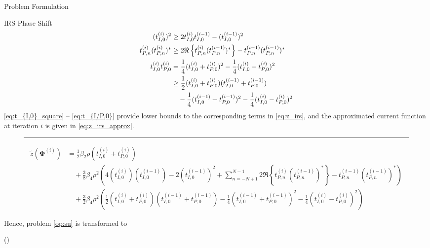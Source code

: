\documentclass{IEEEtran}
\begin{document}
\begin{section}{Problem Formulation}
\begin{subsection}{IRS Phase Shift}
\begin{align}
			(t_{I,0}^{(i)})^2
			& \ge 2 t_{I,0}^{(i)}t_{I,0}^{(i-1)} - (t_{I,0}^{(i-1)})^2\label{eq:t_{I,0}_square}\\
			t_{P,n}^{(i)} (t_{P,n}^{(i)})^*
			& \ge 2 \Re\left\{t_{P,n}^{(i)} (t_{P,n}^{(i-1)})^*\right\} - t_{P,n}^{(i-1)} (t_{P,n}^{(i-1)})^*\\
			t_{I,0}^{(i)} t_{P,0}^{(i)}
			& = \frac{1}{4}(t_{I,0}^{(i)} + t_{P,0}^{(i)})^2 - \frac{1}{4}(t_{I,0}^{(i)} - t_{P,0}^{(i)})^2\nonumber\\
			& \ge \frac{1}{2}(t_{I,0}^{(i)} + t_{P,0}^{(i)})(t_{I,0}^{(i-1)} + t_{P,0}^{(i-1)})\nonumber\\
			& \quad - \frac{1}{4}(t_{I,0}^{(i-1)} + t_{P,0}^{(i-1)})^2 - \frac{1}{4}(t_{I,0}^{(i)} - t_{P,0}^{(i)})^2\label{eq:t_{I/P,0}}
		\end{align}
		\ref{eq:t_{I,0}_square} -- \ref{eq:t_{I/P,0}} provide lower bounds to the corresponding terms in \ref{eq:z_irs}, and the approximated current function at iteration $i$ is given in \ref{eq:z_irs_approx}.
		\begin{figure}[b]
			\hrule
			\begin{equation}\label{eq:z_irs_approx}
				\begin{split}
					\tilde{z}(\boldsymbol{\Phi}^{(i)})
					& = \frac{1}{2}{\beta_2}{\rho}(t_{I,0}^{(i)}+t_{P,0}^{(i)})\\
					& \quad + \frac{3}{8}{\beta_4}{\rho^2} \left(4 (t_{I,0}^{(i)})(t_{I,0}^{(i-1)}) - 2 (t_{I,0}^{(i-1)})^2 + \sum_{n=-N+1}^{N-1}{2 \Re\left\{t_{P,n}^{(i)} (t_{P,n}^{(i-1)})^*\right\} - t_{P,n}^{(i-1)} (t_{P,n}^{(i-1)})^*}\right)\\
					& \quad + \frac{3}{2}{\beta_4}{\rho^2} \left(\frac{1}{2}(t_{I,0}^{(i)} + t_{P,0}^{(i)})(t_{I,0}^{(i-1)} + t_{P,0}^{(i-1)}) - \frac{1}{4}(t_{I,0}^{(i-1)} + t_{P,0}^{(i-1)})^2 - \frac{1}{4}(t_{I,0}^{(i)} - t_{P,0}^{(i)})^2\right)
				\end{split}
			\end{equation}
		\end{figure}
		Hence, problem \ref{op:su} is transformed to
		\begin{maxi!}
			{\boldsymbol{\boldsymbol{\Phi}}}{(\boldsymbol{\Phi})}{\label{op:su_irs}}{\label{eq:su_irs_target}}

\end{maxi!}
\end{subsection}
\end{section}
\end{document}
